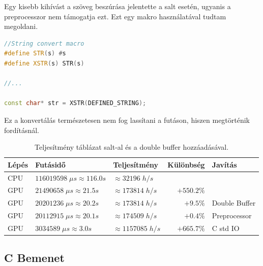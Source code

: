 Egy kisebb kihívást a szöveg beszúrása jelentette a salt esetén, ugyanis a preprocesszor nem támogatja ezt. Ezt egy makro használatával tudtam megoldani.

\begin{lstlisting}[language={C++}]
//String convert macro
#define STR(s) #s
#define XSTR(s) STR(s)

//...

const char* str = XSTR(DEFINED_STRING);
\end{lstlisting}

Ez a konvertálás természetesen nem fog lassítani a futáson, hiszen megtörténik fordításnál.


\begin{table}[H]
    \centering
    \begin{tabular}{l|l|l|r|l}
        \textbf{Lépés} & \textbf{Futásidő} & \textbf{Teljesítmény} & \textbf{Különbség} & \textbf{Javítás} \\
        \hline
        \hline
        
        CPU & $\num{116 019 598} \; \mu s \approx \num{116.0}s $ & $\approx \num{32 196} \; h/s$ & & \\
        \hline
                            
        GPU & $\num{21 490 658} \; \mu s \approx \num{21.5}s $ & $\approx \num{173 814} \; h/s$ & $+550.2\%$ & \\
        \hline
        
        GPU & $\num{20 201 236} \; \mu s \approx \num{20.2}s $ & $\approx \num{173 814} \; h/s$ & $+9.5\%$ & Double Buffer \\
        \hline
        
        GPU & $\num{20 112 915} \; \mu s \approx \num{20.1}s $ & $\approx \num{174 509} \; h/s$ & $+0.4\%$ & Preprocessor \\
        \hline
        
        GPU & $\num{3 034 589} \; \mu s \approx \num{3.0}s $ & $\approx \num{1 157 085} \; h/s$ & $+665.7\%$ & C std IO \\
        \hline
    \end{tabular}
    \caption{Teljesítmény táblázat salt-al és a double buffer hozzáadásával.}
\end{table}



\subsection{C Bemenet}



